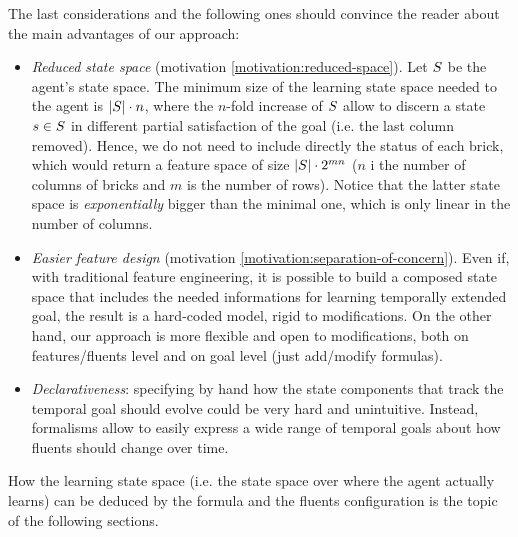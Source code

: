 \begin{example}
	The last considerations and the following ones should convince the reader about the main advantages of our approach:
	\begin{itemize} 
		\item \emph{Reduced state space} (motivation \ref{motivation:reduced-space}). Let $S$ be the agent's state space. The minimum size of the learning state space needed to the agent is $|S| \cdot n$, where the $n$-fold increase of $S$  allow to discern a state $s\in S$ in different partial satisfaction of the goal (i.e. the last column removed). Hence, we do not need to include directly the status of each brick, which would return a feature space of size $|S| \cdot 2^{mn}$ ($n$ i the number of columns of bricks and $m$ is the number of rows). Notice that the latter state space is \emph{exponentially} bigger than the minimal one, which is only linear in the number of columns. 
		\item \emph{Easier feature design} (motivation \ref{motivation:separation-of-concern}). Even if, with traditional feature engineering, it is possible to build a composed state space that includes the needed informations for learning temporally extended goal, the result is a hard-coded model, rigid to modifications. On the other hand, our approach is more flexible and open to modifications, both on features/fluents level and on \LLf goal level (just add/modify \LLf formulas).
		\item \emph{Declarativeness}: specifying by hand how the state components that track the temporal goal should evolve could be very hard and unintuitive. Instead, \LLf formalisms allow to easily express a wide range of temporal goals about how fluents should change over time.
	\end{itemize}
	
\end{example}

\medskip

How the learning state space (i.e. the state space over where the agent actually learns) can be deduced by the \LLf formula and the fluents configuration is the topic of the following sections.

